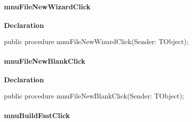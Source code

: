 \documentclass{report}
\newif\ifpdf
\begin{document}
\paragraph*{mnuFileNewWizardClick}\hspace*{\fill}

\label{editor.TfrmEditor-mnuFileNewWizardClick}
\begin{list}{}{
\setlength{\itemindent}{0cm}
\setlength{\listparindent}{0cm}
\setlength{\leftmargin}{\evensidemargin}
\addtolength{\leftmargin}{\tmplength}
\settowidth{\labelsep}{X}
\addtolength{\leftmargin}{\labelsep}
\setlength{\labelwidth}{\tmplength}
}
\item[\textbf{Declaration}\hfill]
\ifpdf
\begin{flushleft}
\fi
\begin{ttfamily}
public procedure mnuFileNewWizardClick(Sender: TObject);\end{ttfamily}

\ifpdf
\end{flushleft}
\fi

\end{list}
\paragraph*{mnuFileNewBlankClick}\hspace*{\fill}

\label{editor.TfrmEditor-mnuFileNewBlankClick}
\begin{list}{}{
\setlength{\itemindent}{0cm}
\setlength{\listparindent}{0cm}
\setlength{\leftmargin}{\evensidemargin}
\addtolength{\leftmargin}{\tmplength}
\settowidth{\labelsep}{X}
\addtolength{\leftmargin}{\labelsep}
\setlength{\labelwidth}{\tmplength}
}
\item[\textbf{Declaration}\hfill]
\ifpdf
\begin{flushleft}
\fi
\begin{ttfamily}
public procedure mnuFileNewBlankClick(Sender: TObject);\end{ttfamily}

\ifpdf
\end{flushleft}
\fi

\end{list}
\paragraph*{mnuBuildFastClick}\hspace*{\fill}
\end{document}
